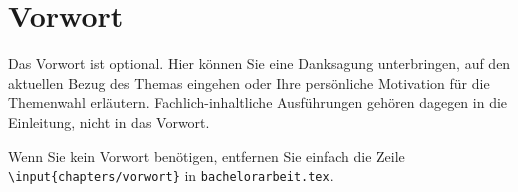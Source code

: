 \chapter*{Vorwort}

Das Vorwort ist optional. Hier können Sie eine Danksagung unterbringen, auf
den aktuellen Bezug des Themas eingehen oder Ihre persönliche Motivation für
die Themenwahl erläutern. Fachlich-inhaltliche Ausführungen gehören dagegen
in die Einleitung, nicht in das Vorwort.

Wenn Sie kein Vorwort benötigen, entfernen Sie einfach die Zeile
\texttt{\textbackslash input\{chapters/vorwort\}} in \texttt{bachelorarbeit.tex}.

